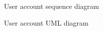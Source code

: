 ﻿\documentclass{article}
\begin{document}
\begin{figure}[H]
    \centering
    \begin{center}
    \end{center}
    \caption{User account sequence diagram}
    \label{fig:my_label}
\end{figure}

\begin{figure}[H]
    \centering
    \begin{center}
    \end{center}
    \caption{User account UML diagram}
    \label{fig:my_label}
\end{figure}
\end{document}
